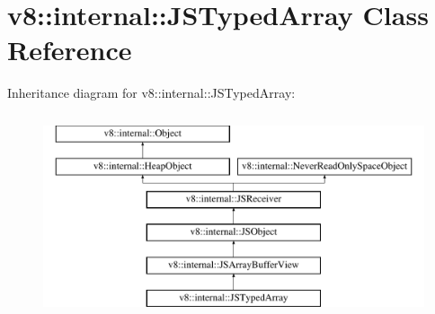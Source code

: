 \hypertarget{classv8_1_1internal_1_1JSTypedArray}{}\section{v8\+:\+:internal\+:\+:J\+S\+Typed\+Array Class Reference}
\label{classv8_1_1internal_1_1JSTypedArray}
Inheritance diagram for v8\+:\+:internal\+:\+:J\+S\+Typed\+Array\+:\begin{figure}[H]
\begin{center}
\leavevmode
\includegraphics[height=6.000000cm]{classv8_1_1internal_1_1JSTypedArray}
\end{center}
\end{figure}

